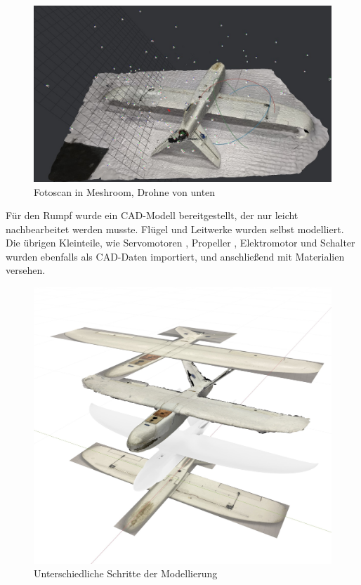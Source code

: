 \begin{figure}[H]
\begin{center}
\includegraphics[width=\textwidth]{gfx/prod/plane/meshroom1.jpg}
\caption{Fotoscan in Meshroom, Drohne von unten}
\label{meshroom2}
\end{center}
\end{figure}

Für den Rumpf wurde ein CAD-Modell bereitgestellt, der nur leicht nachbearbeitet werden musste. Flügel und Leitwerke wurden selbst modelliert.\\
Die übrigen Kleinteile, wie Servomotoren , Propeller , Elektromotor  und Schalter  wurden ebenfalls als CAD-Daten importiert, und anschließend mit Materialien versehen.

\begin{figure}[H]
\begin{center}
\includegraphics[width=\textwidth]{gfx/prod/plane/plane5.jpg}
\caption{Unterschiedliche Schritte der Modellierung}
\label{drohne_modell}
\end{center}
\end{figure}

